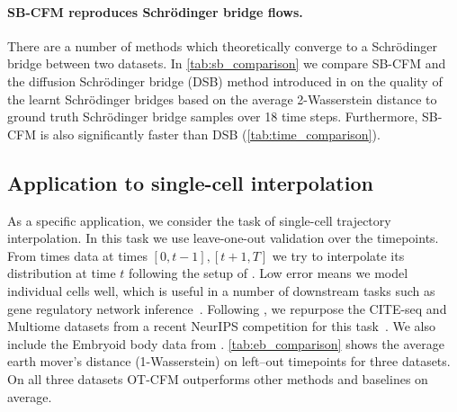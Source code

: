 \documentclass[10pt]{article}
\theoremstyle{plain}
\theoremstyle{definition}
\theoremstyle{remark}
\begin{document}
\paragraph{SB-CFM reproduces Schr\"odinger bridge flows.} There are a number of methods which theoretically converge to a Schr\"odinger bridge between two datasets. In \autoref{tab:sb_comparison} we compare SB-CFM and the diffusion Schr\"odinger bridge (DSB) method introduced in \citet{de_bortoli_diffusion_2021} on the quality of the learnt Schr\"odinger bridges based on the average 2-Wasserstein distance to ground truth Schr\"odinger bridge samples over 18 time steps. Furthermore, SB-CFM is also significantly faster than DSB (\autoref{tab:time_comparison}).

\subsection{Application to single-cell interpolation} 

As a specific application, we consider the task of single-cell trajectory interpolation. In this task we use leave-one-out validation over the timepoints. From times data at times $[0,t-1], [t+1,T]$ we try to interpolate its distribution at time $t$ following the setup of \citet{schiebinger_optimal-transport_2019,tong_trajectorynet_2020,huguet_manifold_2022}. Low error means we model individual cells well, which is useful in a number of downstream tasks such as gene regulatory network inference~\citep{aliee_beyond_2021,yeo_generative_2021}. Following \citet{huguet_geodesic_2022}, we repurpose the CITE-seq and Multiome datasets from a recent NeurIPS competition for this task~\citep{burkhardt_multimodal_2022}. We also include the Embryoid body data from \citet{moon_visualizing_2019,tong_trajectorynet_2020}. \autoref{tab:eb_comparison} shows the average earth mover's distance (1-Wasserstein) on left--out timepoints for three datasets. On all three datasets OT-CFM outperforms other methods and baselines on average.
\end{document}
